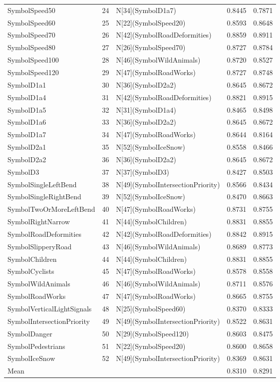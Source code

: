 \begin{tabular}{lllll}
SymbolSpeed50 & 24 & N[34](SymbolD1a7) & 0.8445 & 0.7871 \\
SymbolSpeed60 & 25 & N[22](SymbolSpeed20) & 0.8593 & 0.8648 \\
SymbolSpeed70 & 26 & N[42](SymbolRoadDeformities) & 0.8859 & 0.8911 \\
SymbolSpeed80 & 27 & N[26](SymbolSpeed70) & 0.8727 & 0.8784 \\
SymbolSpeed100 & 28 & N[46](SymbolWildAnimals) & 0.8720 & 0.8527 \\
SymbolSpeed120 & 29 & N[47](SymbolRoadWorks) & 0.8727 & 0.8748 \\
SymbolD1a1 & 30 & N[36](SymbolD2a2) & 0.8645 & 0.8672 \\
SymbolD1a4 & 31 & N[42](SymbolRoadDeformities) & 0.8821 & 0.8915 \\
SymbolD1a5 & 32 & N[31](SymbolD1a4) & 0.8465 & 0.8498 \\
SymbolD1a6 & 33 & N[36](SymbolD2a2) & 0.8645 & 0.8672 \\
SymbolD1a7 & 34 & N[47](SymbolRoadWorks) & 0.8644 & 0.8164 \\
SymbolD2a1 & 35 & N[52](SymbolIceSnow) & 0.8558 & 0.8466 \\
SymbolD2a2 & 36 & N[36](SymbolD2a2) & 0.8645 & 0.8672 \\
SymbolD3 & 37 & N[37](SymbolD3) & 0.8427 & 0.8503 \\
SymbolSingleLeftBend & 38 & N[49](SymbolIntersectionPriority) & 0.8566 & 0.8434 \\
SymbolSingleRightBend & 39 & N[52](SymbolIceSnow) & 0.8470 & 0.8663 \\
SymbolTwoOrMoreLeftBend & 40 & N[47](SymbolRoadWorks) & 0.8731 & 0.8755 \\
SymbolRightNarrow & 41 & N[44](SymbolChildren) & 0.8831 & 0.8855 \\
SymbolRoadDeformities & 42 & N[42](SymbolRoadDeformities) & 0.8842 & 0.8915 \\
SymbolSlipperyRoad & 43 & N[46](SymbolWildAnimals) & 0.8689 & 0.8773 \\
SymbolChildren & 44 & N[44](SymbolChildren) & 0.8831 & 0.8855 \\
SymbolCyclists & 45 & N[47](SymbolRoadWorks) & 0.8578 & 0.8558 \\
SymbolWildAnimals & 46 & N[46](SymbolWildAnimals) & 0.8711 & 0.8576 \\
SymbolRoadWorks & 47 & N[47](SymbolRoadWorks) & 0.8665 & 0.8755 \\
SymbolVerticalLightSignals & 48 & N[25](SymbolSpeed60) & 0.8370 & 0.8333 \\
SymbolIntersectionPriority & 49 & N[49](SymbolIntersectionPriority) & 0.8522 & 0.8631 \\
SymbolDanger & 50 & N[29](SymbolSpeed120) & 0.8603 & 0.8475 \\
SymbolPedestrians & 51 & N[22](SymbolSpeed20) & 0.8600 & 0.8658 \\
SymbolIceSnow & 52 & N[49](SymbolIntersectionPriority) & 0.8369 & 0.8631 \\
Mean &  &  & 0.8310 & 0.8291 \\
\bottomrule
\end{tabular}

